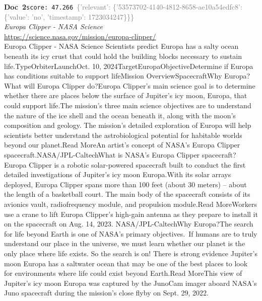 \documentclass[a4paper,11pt]{article}
\begin{document}
\begin{docenv}
{\footnotesize\textcolor{doccolor}{\textbf{Doc~2}}}\hfill{\tiny\texttt{score:~47.266}}\ {\tiny\textcolor{gray}{\{'relevant': \{'53573702-4140-4812-8658-ae10a54edfc8': \{'value': 'no', 'timestamp': 1723034247\}\}\}}}\\[3pt]
{\small\textit{Europa Clipper - NASA Science}}\\[2pt]
{\tiny\url{https://science.nasa.gov/mission/europa-clipper/}}\\[4pt]
{\footnotesize Europa Clipper - NASA Science
Scientists predict Europa has a salty ocean beneath its icy crust that could hold the building blocks necessary to sustain life.TypeOrbiterLaunchOct. 10, 2024TargetEuropaObjectiveDetermine if Europa has conditions suitable to support lifeMission OverviewSpacecraftWhy Europa?What will Europa Clipper do?Europa Clipper’s main science goal is to determine whether there are places below the surface of Jupiter’s icy moon, Europa, that could support life.The mission’s three main science objectives are to understand the nature of the ice shell and the ocean beneath it, along with the moon’s composition and geology. The mission’s detailed exploration of Europa will help scientists better understand the astrobiological potential for habitable worlds beyond our planet.Read MoreAn artist's concept of NASA’s Europa Clipper spacecraft.NASA/JPL-CaltechWhat is NASA’s Europa Clipper spacecraft?Europa Clipper is a robotic solar-powered spacecraft built to conduct the first detailed investigations of Jupiter's icy moon Europa.With its solar arrays deployed, Europa Clipper spans more than 100 feet (about 30 meters) – about the length of a basketball court. The main body of the spacecraft consists of its avionics vault, radiofrequency module, and propulsion module.Read MoreWorkers use a crane to lift Europa Clipper's high-gain antenna as they prepare to install it on the spacecraft on Aug. 14, 2023. NASA/JPL-CaltechWhy Europa?The search for life beyond Earth is one of NASA’s primary objectives. If humans are to truly understand our place in the universe, we must learn whether our planet is the only place where life exists. So the search is on! There is strong evidence Jupiter's moon Europa has a saltwater ocean that may be one of the best places to look for environments where life could exist beyond Earth.Read MoreThis view of Jupiter’s icy moon Europa was captured by the JunoCam imager aboard NASA’s Juno spacecraft during the mission’s close flyby on Sept. 29, 2022.}
\end{docenv}
\end{document}
